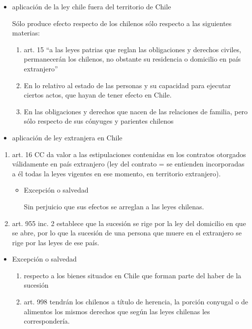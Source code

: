 \documentclass[]{article}
\providecommand{\tightlist}{%
  \setlength{\itemsep}{0pt}\setlength{\parskip}{0pt}}
\begin{document}
\begin{itemize}
  \begin{itemize}
  \item
    aplicación de la ley chile fuera del territorio de Chile

    Sólo produce efecto respecto de los chilenos sólo respecto a las
    siguientes materias:

    \begin{enumerate}
    \def\labelenumi{\arabic{enumi}.}
    \tightlist
    \item
      art. 15 ``a las leyes patrias que reglan las obligaciones y
      derechos civiles, permanecerán los chilenos, no obstante su
      residencia o domicilio en país extranjero''
    \item
      En lo relativo al estado de las personas y su capacidad para
      ejecutar ciertos actos, que hayan de tener efecto en Chile.
    \item
      En las obligaciones y derechos que nacen de las relaciones de
      familia, pero sólo respecto de sus cónyuges y parientes chilenos
    \end{enumerate}
  \item
    aplicación de ley extranjera en Chile
  \end{itemize}

  \begin{enumerate}
  \def\labelenumi{\arabic{enumi}.}
  \tightlist
  \item
    art. 16 CC da valor a las estipulaciones contenidas en los contratos
    otorgados válidamente en país extranjero (ley del contrato = se
    entienden incorporadas a él todas la leyes vigentes en ese momento,
    en territorio extranjero).

    \begin{itemize}
    \item
      Excepción o salvedad

      Sin perjuicio que sus efectos se arreglan a las leyes chilenas.
    \end{itemize}
  \item
    art. 955 inc. 2 establece que la sucesión se rige por la ley del
    domicilio en que se abre, por lo que la sucesión de una persona que
    muere en el extranjero se rige por las leyes de ese país.
  \end{enumerate}

  \begin{itemize}
  \tightlist
  \item
    Excepción o salvedad

    \begin{enumerate}
    \def\labelenumi{\arabic{enumi}.}
    \tightlist
    \item
      respecto a los bienes situados en Chile que forman parte del haber
      de la sucesión
    \item
      art. 998 tendrán los chilenos a título de herencia, la porción
      conyugal o de alimentos los mismos derechos que según las leyes
      chilenas les correspondería.
    \end{enumerate}
  \end{itemize}
\end{itemize}
\end{document}
